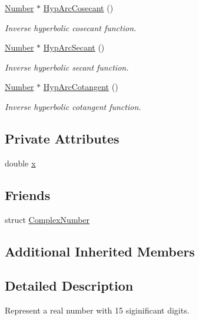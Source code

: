 \begin{DoxyCompactItemize}
\hyperlink{structNumber}{Number} $\ast$ \hyperlink{structRealNumber_a9012f76e46de683e6c826bcdf719ca2f}{Hyp\+Arc\+Cosecant} ()
\begin{DoxyCompactList}\small\item\em Inverse hyperbolic cosecant function. \end{DoxyCompactList}\item 
\hyperlink{structNumber}{Number} $\ast$ \hyperlink{structRealNumber_a2c63d0e9efa401cb5ff4a459f339dfb5}{Hyp\+Arc\+Secant} ()
\begin{DoxyCompactList}\small\item\em Inverse hyperbolic secant function. \end{DoxyCompactList}\item 
\hyperlink{structNumber}{Number} $\ast$ \hyperlink{structRealNumber_ab83d64a095c365070fe40273b0bb173c}{Hyp\+Arc\+Cotangent} ()
\begin{DoxyCompactList}\small\item\em Inverse hyperbolic cotangent function. \end{DoxyCompactList}\end{DoxyCompactItemize}
\subsection*{Private Attributes}
\begin{DoxyCompactItemize}
\item 
double \hyperlink{structRealNumber_ac33d80bee75448490199a0aa48ccce1e}{x}
\end{DoxyCompactItemize}
\subsection*{Friends}
\begin{DoxyCompactItemize}
\item 
struct \hyperlink{structRealNumber_ae59451cc698db2f80a85244883578673}{Complex\+Number}
\end{DoxyCompactItemize}
\subsection*{Additional Inherited Members}


\subsection{Detailed Description}
Represent a real number with 15 siginificant digits. 

